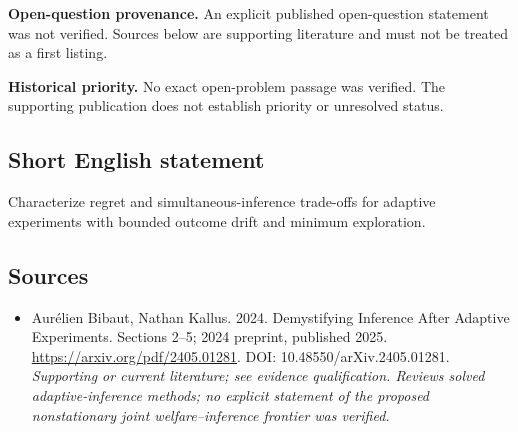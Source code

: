 \documentclass[11pt]{article}
\begin{document}
\par\textbf{Open-question provenance.} An explicit published open-question statement was not verified. Sources below are supporting literature and must not be treated as a first listing.

\par\textbf{Historical priority.} No exact open-problem passage was verified. The supporting publication does not establish priority or unresolved status.

\subsection{Short English statement}
Characterize regret and simultaneous-inference trade-offs for adaptive experiments with bounded outcome drift and minimum exploration.

\subsection{Sources}
\begin{itemize}\raggedright
\item[\textnormal{[S1]}]\hypertarget{source:30007710:1}{} Aurélien Bibaut, Nathan Kallus. 2024. Demystifying Inference After Adaptive Experiments. Sections 2–5; 2024 preprint, published 2025.
\url{https://arxiv.org/pdf/2405.01281}.
DOI: 10.48550/arXiv.2405.01281.
{\small\textit{Supporting or current literature; see evidence qualification. Reviews solved adaptive-inference methods; no explicit statement of the proposed nonstationary joint welfare–inference frontier was verified.}}
\end{itemize}
\end{document}
